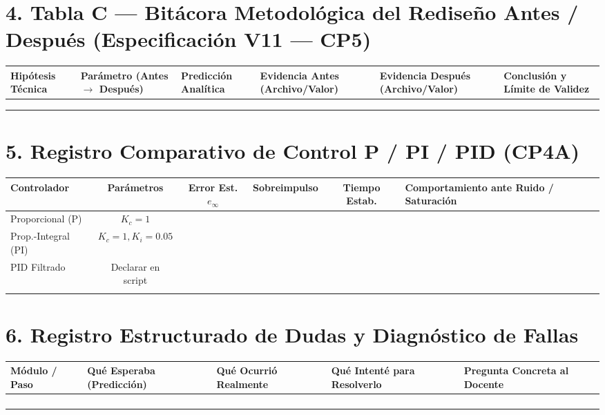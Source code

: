 \documentclass[11pt, a4paper]{article}
\begin{document}
\newpage
\section*{4. Tabla C — Bitácora Metodológica del Rediseño Antes / Después (Especificación V11 — CP5)}
\begin{center}
\begin{tabularx}{\textwidth}{@{} L L L L L L @{}}
\toprule
\textbf{Hipótesis Técnica} & \textbf{Parámetro (Antes $\to$ Después)} & \textbf{Predicción Analítica} & \textbf{Evidencia Antes (Archivo/Valor)} & \textbf{Evidencia Después (Archivo/Valor)} & \textbf{Conclusión y Límite de Validez} \\ \midrule
 & & & & & \\ \addlinespace[45pt]
 & & & & & \\ \addlinespace[45pt] \bottomrule
\end{tabularx}
\end{center}

\section*{5. Registro Comparativo de Control P / PI / PID (CP4A)}
\begin{center}
\begin{tabularx}{\textwidth}{@{} l c c c c L @{}}
\toprule
\textbf{Controlador} & \textbf{Parámetros} & \textbf{Error Est. $e_\infty$} & \textbf{Sobreimpulso} & \textbf{Tiempo Estab.} & \textbf{Comportamiento ante Ruido / Saturación} \\ \midrule
Proporcional (P) & $K_c = 1$ & & & & \\ \addlinespace[14pt]
Prop.-Integral (PI) & $K_c = 1, K_i = 0.05$ & & & & \\ \addlinespace[14pt]
PID Filtrado & Declarar en script & & & & \\ \addlinespace[14pt] \bottomrule
\end{tabularx}
\end{center}

\section*{6. Registro Estructurado de Dudas y Diagnóstico de Fallas}
\begin{center}
\begin{tabularx}{\textwidth}{@{} l L L L L @{}}
\toprule
\textbf{Módulo / Paso} & \textbf{Qué Esperaba (Predicción)} & \textbf{Qué Ocurrió Realmente} & \textbf{Qué Intenté para Resolverlo} & \textbf{Pregunta Concreta al Docente} \\ \midrule
 & & & & \\ \addlinespace[24pt]
 & & & & \\ \addlinespace[24pt]
 & & & & \\ \addlinespace[24pt] \bottomrule
\end{tabularx}
\end{center}
\end{document}
